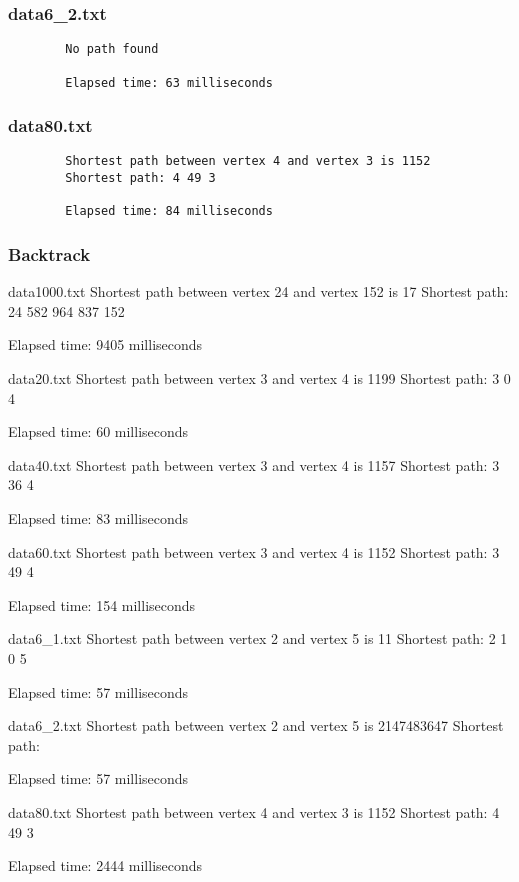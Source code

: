 \documentclass{article}
\begin{document}
    \subsubsection*{data6\_2.txt}
    \begin{verbatim}
        No path found

        Elapsed time: 63 milliseconds
    \end{verbatim}

    \subsubsection*{data80.txt}
    \begin{verbatim}
        Shortest path between vertex 4 and vertex 3 is 1152
        Shortest path: 4 49 3

        Elapsed time: 84 milliseconds
    \end{verbatim}

    \subsubsection{Backtrack}

data1000.txt
Shortest path between vertex 24 and vertex 152 is 17
Shortest path: 24 582 964 837 152 

Elapsed time: 9405 milliseconds

data20.txt
Shortest path between vertex 3 and vertex 4 is 1199
Shortest path: 3 0 4 

Elapsed time: 60 milliseconds

data40.txt
Shortest path between vertex 3 and vertex 4 is 1157
Shortest path: 3 36 4 

Elapsed time: 83 milliseconds

data60.txt
Shortest path between vertex 3 and vertex 4 is 1152
Shortest path: 3 49 4 

Elapsed time: 154 milliseconds

data6_1.txt
Shortest path between vertex 2 and vertex 5 is 11
Shortest path: 2 1 0 5 

Elapsed time: 57 milliseconds

data6_2.txt
Shortest path between vertex 2 and vertex 5 is 2147483647
Shortest path: 

Elapsed time: 57 milliseconds

data80.txt
Shortest path between vertex 4 and vertex 3 is 1152
Shortest path: 4 49 3 

Elapsed time: 2444 milliseconds
\end{document}
